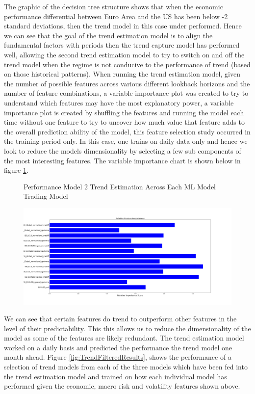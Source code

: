 \documentclass[11pt]{article}
\begin{document}
The graphic of the decision tree structure shows that when the economic performance differential between Euro Area and the US has been below -2 standard deviations, then the trend model in this case under performed. Hence we can see that the goal of the trend estimation model is to align the fundamental factors with periods then the trend capture model has performed well, allowing the second trend estimation model to try to switch on and off the trend model when the regime is not conducive to the performance of trend (based on those historical patterns).
\clearpage
When running the trend estimation model, given the number of possible features across various different lookback horizons and the number of feature combinations, a variable importance plot was created to try to understand which features may have the most explanatory power, a variable importance plot is created by shuffling the features and running the model each time without one feature to try to uncover how much value that feature adds to the overall prediction ability of the model, this feature selection study occurred in the training period only. \newline In this case, one trains on daily data only and hence we look to reduce the models dimensionality by selecting a few sub components of the most interesting features. The variable importance chart is shown below in figure \ref{fig:varimp_RF_erf}.

\begin{figure}[h]
    \centering
	\caption{Performance Model 2 Trend Estimation Across Each ML Model Trading Model}    
	\includegraphics[width=1\textwidth]{varimp_RF_erf}
    \label{fig:varimp_RF_erf}
     \caption*{}
\end{figure}
We can see that certain features do trend to outperform other features in the level of their predictability. This this allows us to reduce the dimensionality of the model as some of the features are likely redundant. The trend estimation model worked on a daily basis and predicted the performance the trend model one month ahead.  Figure \ref{fig:TrendFilteredResults}, shows the performance of a selection of trend models from each of the three models which have been fed into the trend estimation model and trained on how each individual model has performed given the economic, macro risk and volatility features shown above.
\end{document}
